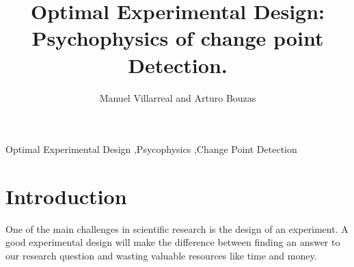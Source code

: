 \documentclass[preprint,review,12pt]{elsarticle}
\begin{document}
\begin{frontmatter}


\title{Optimal Experimental Design: Psychophysics of change point Detection.}




\author{Manuel Villarreal and Arturo Bouzas}

\address{Mexico City, Mexico}

\begin{abstract}
\end{abstract}

\begin{keyword}
Optimal Experimental Design \sep Psycophysics \sep Change Point Detection


\end{keyword}

\end{frontmatter}

\linenumbers

\section{Introduction}
\label{S:1}

One of the main challenges in scientific research is the design of an experiment. A good experimental design will make the difference between finding an answer to our research question and wasting valuable resources like time and money.
\end{document}
